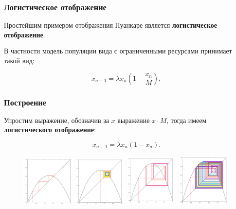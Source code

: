 \begin{frame}
	\frametitle{Логистическое отображение}
	Простейшим примером отображения Пуанкаре является \textbf{логистическое отображение}.

	\phantom{42}

	В частности модель популяции вида с ограниченными ресурсами принимает такой вид:

	$$ x_{n+1} = \lambda x_n \left( 1 - \frac{x_n}{M}  \right),$$


\end{frame}

\begin{frame}
	\frametitle{Построение}

	Упростим выражение, обозначив за $x$ выражение $x \cdot M$, тогда имеем \textbf{логистического отображение}: 

	$$x_{n+1} = \lambda x_n \left( 1 - x_n  \right).$$

	\begin{figure}
    \centering
    \includegraphics[width=0.24\textwidth]{img/25.png}
    \includegraphics[width=0.24\textwidth]{img/3.png}
    \includegraphics[width=0.24\textwidth]{img/355.png}
    \includegraphics[width=0.24\textwidth]{img/365.png}
    \label{fig:lbl}
\end{figure}
\end{frame}

